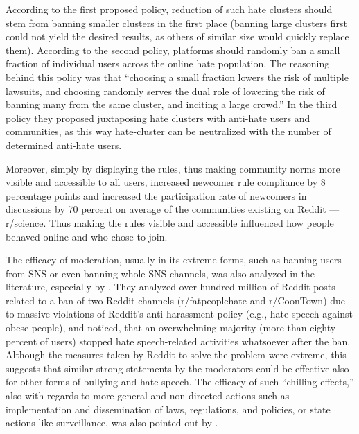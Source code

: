 \documentclass[a4paper,fleqn]{cas-dc}
\begin{document}
According to the first proposed policy, reduction of such hate clusters
should stem from banning smaller clusters in the first place (banning
large clusters first could not yield the desired results, as others of
similar size would quickly replace them). According to the second
policy, platforms should randomly ban a small fraction of individual
users across the online hate population. The reasoning behind this
policy was that ``choosing a small fraction lowers the risk of multiple
lawsuits, and choosing randomly serves the dual role of lowering the
risk of banning many from the same cluster, and inciting a large crowd.''
In the third policy they proposed juxtaposing hate clusters with
anti-hate users and communities, as this way hate-cluster can be
neutralized with the number of determined anti-hate users.

Moreover, simply by displaying the rules, thus making community norms
more visible and accessible to all users, \citet{matias2019preventing} increased
newcomer rule compliance by 8 percentage points and increased the
participation rate of newcomers in discussions by 70 percent on average
of the communities existing on Reddit --- r/science. Thus making the
rules visible and accessible influenced how people behaved online and
who chose to join.

The efficacy of moderation, usually in its extreme forms, such as
banning users from SNS or even banning whole SNS channels, was also
analyzed in the literature, especially by \citet{chandrasekharan2017you}. 
They analyzed over hundred million of Reddit posts related to a ban of
two Reddit channels (r/fatpeoplehate and r/CoonTown) due to massive
violations of Reddit's anti-harassment policy (e.g., hate speech against
obese people), and noticed, that an overwhelming majority (more than
eighty percent of users) stopped hate speech-related activities
whatsoever after the ban. Although the measures taken by Reddit to solve
the problem were extreme, this suggests that similar strong statements
by the moderators could be effective also for other forms of bullying
and hate-speech. The efficacy of such ``chilling effects,'' also with
regards to more general and non-directed actions such as implementation
and dissemination of laws, regulations, and policies, or state actions
like surveillance, was also pointed out by \citet{penney2017internet}.
\end{document}
